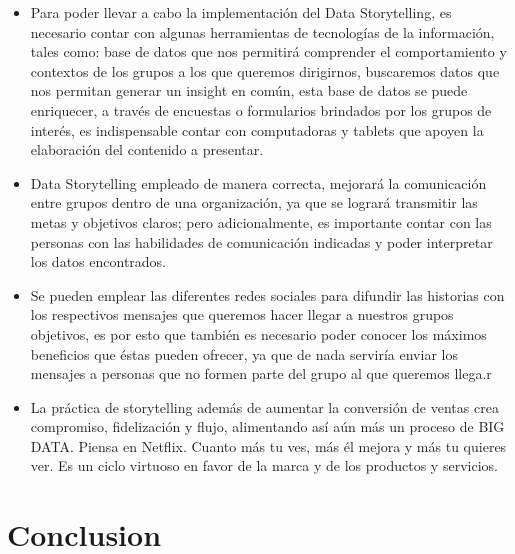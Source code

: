\documentclass[preprint,12pt]{elsarticle}
\begin{document}
\begin{itemize}

\item Para poder llevar a cabo la implementación del Data Storytelling, es necesario contar con algunas herramientas de tecnologías de la información, tales como: base de datos que nos permitirá comprender el comportamiento y contextos de los grupos a los que queremos dirigirnos, buscaremos datos que nos permitan generar un insight en común, esta base de datos se puede enriquecer, a través de encuestas o formularios brindados por los grupos de interés, es indispensable contar con computadoras y tablets que apoyen la elaboración del contenido a presentar.\\

\item Data Storytelling empleado de manera correcta, mejorará la comunicación entre grupos dentro de una organización, ya que se logrará transmitir las metas y objetivos claros; pero adicionalmente, es importante contar con las personas con las habilidades de comunicación indicadas y poder interpretar los datos encontrados.\\

\item Se pueden emplear las diferentes redes sociales para difundir las historias con los respectivos mensajes que queremos hacer llegar a nuestros grupos objetivos, es por esto que también es necesario poder conocer los máximos beneficios que éstas pueden ofrecer, ya que de nada serviría enviar los mensajes a personas que no formen parte del grupo al que queremos llega.r\\

\item La práctica de storytelling además de aumentar la conversión de ventas crea compromiso, fidelización y flujo, alimentando así aún más un proceso de BIG DATA. Piensa en Netflix. Cuanto más tu ves, más él mejora y más tu quieres ver. Es un ciclo virtuoso en favor de la marca y de los productos y servicios.\\

\end{itemize}

\newpage

	
\section{Conclusion}
\end{document}
